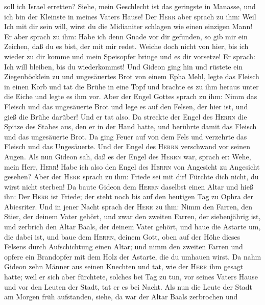 soll ich Israel erretten? Siehe, mein Geschlecht ist das geringste in
Manasse, und ich bin der Kleinste in meines Vaters Hause!
 Der \textsc{Herr} aber sprach zu ihm: Weil Ich mit dir
sein will, wirst du die Midianiter schlagen wie einen einzigen Mann!
 Er aber sprach zu ihm: Habe ich denn Gnade vor dir
gefunden, so gib mir ein Zeichen, daß du es bist, der mit mir redet.
 Weiche doch nicht von hier, bis ich wieder zu dir komme
und mein Speisopfer bringe und es dir vorsetze! Er sprach: Ich will
bleiben, bis du wiederkommst!  Und Gideon ging hin und
rüstete ein Ziegenböcklein zu und ungesäuertes Brot von einem Epha Mehl,
legte das Fleisch in einen Korb und tat die Brühe in eine Topf und
brachte es zu ihm heraus unter die Eiche und legte es ihm vor.
 Aber der Engel Gottes sprach zu ihm: Nimm das Fleisch
und das ungesäuerte Brot und lege es auf den Felsen, der hier ist, und
gieß die Brühe darüber! Und er tat also.  Da streckte der
Engel des \textsc{Herrn} die Spitze des Stabes aus, den er in der Hand
hatte, und berührte damit das Fleisch und das ungesäuerte Brot. Da ging
Feuer auf von dem Fels und verzehrte das Fleisch und das Ungesäuerte.
Und der Engel des \textsc{Herrn} verschwand vor seinen Augen.
 Als nun Gideon sah, daß es der Engel des \textsc{Herrn}
war, sprach er: Wehe, mein Herr, \textsc{Herr}! Habe ich also den Engel
des \textsc{Herrn} von Angesicht zu Angesicht gesehen? 
Aber der \textsc{Herr} sprach zu ihm: Friede sei mit dir! Fürchte dich
nicht, du wirst nicht sterben!  Da baute Gideon dem
\textsc{Herrn} daselbst einen Altar und hieß ihn: Der \textsc{Herr} ist
Friede; der steht noch bis auf den heutigen Tag zu Ophra der Abiesriter.
 Und in jener Nacht sprach der \textsc{Herr} zu ihm: Nimm
den Farren, den Stier, der deinem Vater gehört, und zwar den zweiten
Farren, der siebenjährig ist, und zerbrich den Altar Baals, der deinem
Vater gehört, und haue die Astarte um, die dabei ist, 
und baue dem \textsc{Herrn}, deinem Gott, oben auf der Höhe dieses
Felsens durch Aufschichtung einen Altar; und nimm den zweiten Farren und
opfere ein Brandopfer mit dem Holz der Astarte, die du umhauen wirst.
 Da nahm Gideon zehn Männer aus seinen Knechten und tat,
wie der \textsc{Herr} ihm gesagt hatte; weil er sich aber fürchtete,
solches bei Tag zu tun, vor seines Vaters Hause und vor den Leuten der
Stadt, tat er es bei Nacht.  Als nun die Leute der Stadt
am Morgen früh aufstanden, siehe, da war der Altar Baals zerbrochen und
